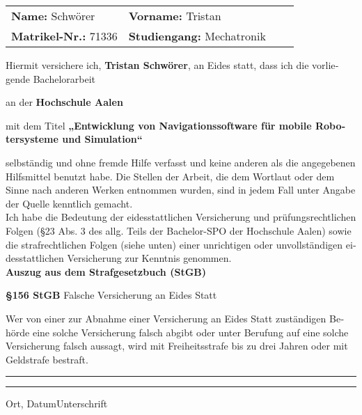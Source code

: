 \begin{otherlanguage}{ngerman}

\vspace*{5mm}

\thispagestyle{empty}

\begin{flushleft}
\begin{tabular}[h]{p{60mm}l p{60mm}l}
\textbf{Name:} Schwörer 			&\textbf{Vorname:} Tristan\\
\textbf{Matrikel-Nr.:} 71336		&\textbf{Studiengang:} Mechatronik\\
\end{tabular}
\end{flushleft}

\vspace*{11mm}

Hiermit versichere ich, \textbf{Tristan Schwörer}, an Eides statt, dass ich die vorliegende Bachelorarbeit

an der \textbf{Hochschule Aalen}

mit dem Titel \textbf{„Entwicklung von Navigationssoftware für mobile Robotersysteme und Simulation“}

selbständig und ohne fremde Hilfe verfasst und keine anderen als die angegebenen Hilfsmittel benutzt habe. Die Stellen der Arbeit, die dem Wortlaut oder dem Sinne nach anderen Werken entnommen wurden, sind in jedem Fall unter Angabe der Quelle kenntlich gemacht.\\

Ich habe die Bedeutung der eidesstattlichen Versicherung und prüfungsrechtlichen Folgen (\S 23 Abs. 3 des allg. Teils der Bachelor-SPO der Hochschule Aalen) sowie die strafrechtlichen Folgen (siehe unten) einer unrichtigen oder unvollständigen eidesstattlichen Versicherung zur Kenntnis genommen.\\

\vspace*{5mm}
\Large\textbf{Auszug aus dem Strafgesetzbuch (StGB)}


\normalsize\textbf{\S 156 StGB} Falsche Versicherung an Eides Statt

Wer von einer zur Abnahme einer Versicherung an Eides Statt zuständigen Behörde eine solche Versicherung falsch abgibt oder unter Berufung auf eine solche Versicherung falsch aussagt, wird mit Freiheitsstrafe bis zu drei Jahren oder mit Geldstrafe bestraft.

\vspace*{20mm}


\rule[-0.2cm]{5cm}{0.5pt} \hspace*{30mm}\rule[-0.2cm]{5cm}{0.5pt}
\newline
Ort, Datum\hspace*{61.85mm}Unterschrift

\end{otherlanguage}